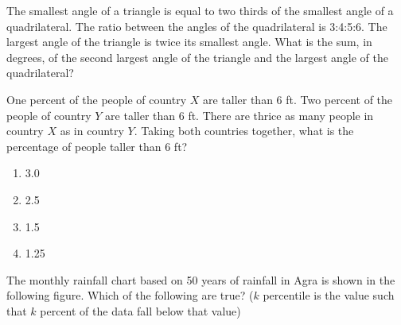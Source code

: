 \item The smallest angle of a triangle is equal to two thirds of the smallest angle of a quadrilateral. The ratio between the angles of the quadrilateral is 3:4:5:6. The largest angle of the triangle is twice its smallest angle. What is the sum, in degrees, of the second largest angle of the triangle and the largest angle of the quadrilateral?

\item One percent of the people of country $X$ are taller than 6 ft. Two percent of the people of country $Y$ are taller than 6 ft. There are thrice as many people in country $X$ as in country $Y$. Taking both countries together, what is the percentage of people taller than 6 ft?
\begin{enumerate}

    \item 3.0
    \item 2.5
    \item 1.5
    \item 1.25
\end{enumerate}

\item The monthly rainfall chart based on 50 years of rainfall in Agra is shown in the following figure. Which of the following are true? ($k$ percentile is the value such that $k$ percent of the data fall below that value)

\begin{figure}[H]
\centering
\pgfplotsset{compat=1.17}



\end{figure}


